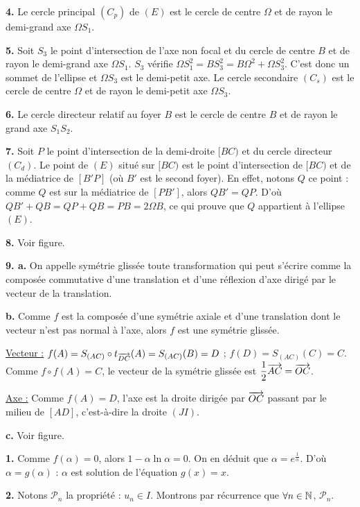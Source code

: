 \documentclass[11pt]{article}
\begin{document}
\textbf{4.} Le cercle principal $(C_p)$ de $(E)$ est le cercle de centre $\Omega$ et de rayon le demi-grand axe $\Omega S_1$.

\textbf{5.} Soit $S_3$ le point d'intersection de l'axe non focal et du cercle de centre $B$ et de rayon le demi-grand axe $\Omega S_1$. $S_3$ vérifie $\Omega S_1^2 = BS_3^2 = B\Omega^2 + \Omega S_3^2$. C'est donc un sommet de l'ellipse et $\Omega S_3$ est le demi-petit axe. Le cercle secondaire $(C_s)$ est le cercle de centre $\Omega$ et de rayon le demi-petit axe $\Omega S_3$.

\textbf{6.} Le cercle directeur relatif au foyer $B$ est le cercle de centre $B$ et de rayon le grand axe $S_1 S_2$.

\textbf{7.} Soit $P$ le point d'intersection de la demi-droite $[BC)$ et du cercle directeur $(C_d)$. Le point de $(E)$ situé sur $[BC)$ est le point d'intersection de $[BC)$ et de la médiatrice de $[B'P]$ (où $B'$ est le second foyer). En effet, notons $Q$ ce point : comme $Q$ est sur la médiatrice de $[PB']$, alors $QB' = QP$. D'où $QB' + QB = QP + QB = PB = 2\Omega B$, ce qui prouve que $Q$ appartient à l'ellipse $(E)$.

\textbf{8.} Voir figure.

\textbf{9. a.} On appelle symétrie glissée toute transformation qui peut s'écrire comme la composée commutative d'une translation et d'une réflexion d'axe dirigé par le vecteur de la translation.

\textbf{b.} Comme $f$ est la composée d'une symétrie axiale et d'une translation dont le vecteur n'est pas normal à l'axe, alors $f$ est une symétrie glissée.

\underline{Vecteur :} $f(A) = S_{(AC)} \circ t_{\overrightarrow{DC}}(A) = S_{(AC)}(B) = D$ ; $f(D) = S_{(AC)}(C) = C$. Comme $f \circ f(A) = C$, le vecteur de la symétrie glissée est $\dfrac{1}{2}\overrightarrow{AC} = \overrightarrow{OC}$.

\underline{Axe :} Comme $f(A) = D$, l'axe est la droite dirigée par $\overrightarrow{OC}$ passant par le milieu de $[AD]$, c'est-à-dire la droite $(JI)$.

\textbf{c.} Voir figure.


\textbf{1.} Comme $f(\alpha) = 0$, alors $1 - \alpha\ln\alpha = 0$. On en déduit que $\alpha = e^{\frac{1}{\alpha}}$. D'où $\alpha = g(\alpha)$ : $\alpha$ est solution de l'équation $g(x) = x$.

\textbf{2.} Notons $\mathcal{P}_n$ la propriété : $u_n \in I$. Montrons par récurrence que $\forall n \in \mathbb{N}$, $\mathcal{P}_n$.
\end{document}
